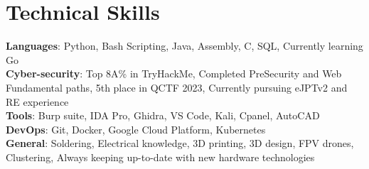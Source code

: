 \section{Technical Skills}

\begin{itemize}[leftmargin=0.15in, label={}]
    \small{\item{
        \textbf{Languages}{: Python, Bash Scripting, Java, Assembly, C, SQL, Currently learning Go} \\ \vspace{1.5mm}
        \textbf{Cyber-security}{: Top 8A\% in TryHackMe, Completed PreSecurity and Web Fundamental paths, 5th place in QCTF 2023, Currently pursuing eJPTv2 and RE experience} \\ \vspace{1.5mm}
        \textbf{Tools}{: Burp suite, IDA Pro, Ghidra, VS Code, Kali, Cpanel, AutoCAD} \\ \vspace{1.5mm}
        \textbf{DevOps}{: Git, Docker, Google Cloud Platform, Kubernetes}\\ \vspace{1.5mm}
        \textbf{General}{: Soldering, Electrical knowledge, 3D printing, 3D design, FPV drones, Clustering, Always keeping up-to-date with new hardware technologies}\\

    }}
\end{itemize}
